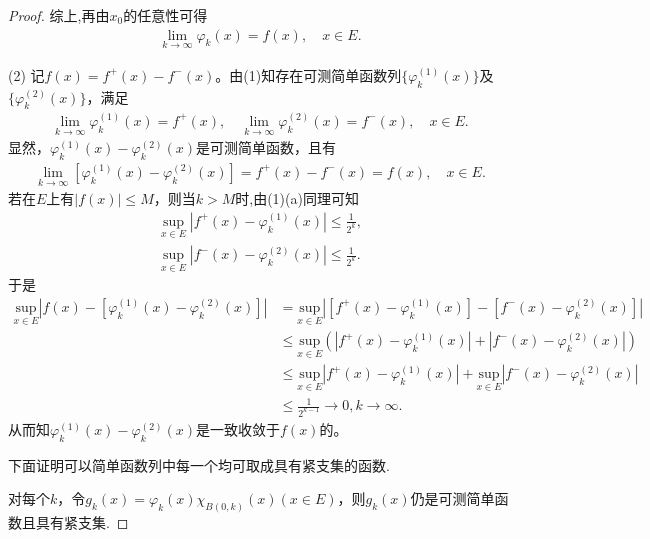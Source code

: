 \documentclass[../../main.tex]{subfiles}%
\begin{document}
\begin{proof}
综上,再由$x_0$的任意性可得
\begin{align*}
\lim_{k \to \infty} \varphi_k(x) = f(x), \quad x \in E.
\end{align*}

(2) 记$f(x) = f^+(x) - f^-(x)$。由(1)知存在可测简单函数列$\{\varphi_k^{(1)}(x)\}$及$\{\varphi_k^{(2)}(x)\}$，满足
\begin{align*}
\lim_{k \to \infty} \varphi_k^{(1)}(x) = f^+(x), \quad \lim_{k \to \infty} \varphi_k^{(2)}(x) = f^-(x), \quad x \in E.
\end{align*}
显然，$\varphi_k^{(1)}(x) - \varphi_k^{(2)}(x)$是可测简单函数，且有
\begin{align*}
\lim_{k \to \infty} [\varphi_k^{(1)}(x) - \varphi_k^{(2)}(x)] = f^+(x) - f^-(x) = f(x), \quad x \in E.
\end{align*}
若在$E$上有$|f(x)| \leqslant M$，则当$k > M$时,由(1)(a)同理可知
\begin{align*}
\sup_{x\in E} |f^+(x) - \varphi_k^{(1)}(x)| \leqslant \frac{1}{2^k},\\
\sup_{x\in E} |f^-(x) - \varphi_k^{(2)}(x)| \leqslant \frac{1}{2^k}.
\end{align*}
于是
\begin{align*}
\underset{x\in E}{\mathrm{sup}}\left| f\left( x \right) -\left[ \varphi _{k}^{(1)}(x)-\varphi _{k}^{(2)}(x) \right] \right|&=\underset{x\in E}{\mathrm{sup}}\left| \left[ f^+\left( x \right) -\varphi _{k}^{\left( 1 \right)}\left( x \right) \right] -\left[ f^-\left( x \right) -\varphi _{k}^{\left( 2 \right)}\left( x \right) \right] \right|
\\
&\leqslant \underset{x\in E}{\mathrm{sup}}\left( \left| f^+\left( x \right) -\varphi _{k}^{\left( 1 \right)}\left( x \right) \right|+\left| f^-\left( x \right) -\varphi _{k}^{\left( 2 \right)}\left( x \right) \right| \right) 
\\
&\leqslant \underset{x\in E}{\mathrm{sup}}\left| f^+\left( x \right) -\varphi _{k}^{\left( 1 \right)}\left( x \right) \right|+\underset{x\in E}{\mathrm{sup}}\left| f^-\left( x \right) -\varphi _{k}^{\left( 2 \right)}\left( x \right) \right|
\\
&\leqslant \frac{1}{2^{k-1}}\rightarrow 0,k\rightarrow \infty .
\end{align*}
从而知$\varphi_k^{(1)}(x) - \varphi_k^{(2)}(x)$是一致收敛于$f(x)$的。 

下面证明可以简单函数列中每一个均可取成具有紧支集的函数.

对每个$k$，令$g_k(x) = \varphi_k(x)\chi_{B(0,k)}(x) (x \in E)$，则$g_k(x)$仍是可测简单函数且具有紧支集.


\end{proof}
\end{document}
